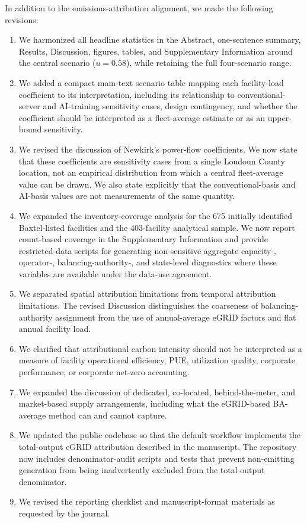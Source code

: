 \documentclass[11pt]{article}
\begin{document}
In addition to the emissions-attribution alignment, we made the following revisions:

\begin{enumerate}[label=\arabic*.]
    \item We harmonized all headline statistics in the Abstract, one-sentence summary, Results, Discussion, figures, tables, and Supplementary Information around the central scenario ($u=0.58$), while retaining the full four-scenario range.
    \item We added a compact main-text scenario table mapping each facility-load coefficient to its interpretation, including its relationship to conventional-server and AI-training sensitivity cases, design contingency, and whether the coefficient should be interpreted as a fleet-average estimate or as an upper-bound sensitivity.
    \item We revised the discussion of Newkirk's power-flow coefficients. We now state that these coefficients are sensitivity cases from a single Loudoun County location, not an empirical distribution from which a central fleet-average value can be drawn. We also state explicitly that the conventional-basis and AI-basis values are not measurements of the same quantity.
    \item We expanded the inventory-coverage analysis for the 675 initially identified Baxtel-listed facilities and the 403-facility analytical sample. We now report count-based coverage in the Supplementary Information and provide restricted-data scripts for generating non-sensitive aggregate capacity-, operator-, balancing-authority-, and state-level diagnostics where these variables are available under the data-use agreement.
    \item We separated spatial attribution limitations from temporal attribution limitations. The revised Discussion distinguishes the coarseness of balancing-authority assignment from the use of annual-average eGRID factors and flat annual facility load.
    \item We clarified that attributional carbon intensity should not be interpreted as a measure of facility operational efficiency, PUE, utilization quality, corporate performance, or corporate net-zero accounting.
    \item We expanded the discussion of dedicated, co-located, behind-the-meter, and market-based supply arrangements, including what the eGRID-based BA-average method can and cannot capture.
    \item We updated the public codebase so that the default workflow implements the total-output eGRID attribution described in the manuscript. The repository now includes denominator-audit scripts and tests that prevent non-emitting generation from being inadvertently excluded from the total-output denominator.
    \item We revised the reporting checklist and manuscript-format materials as requested by the journal.
\end{enumerate}
\end{document}
